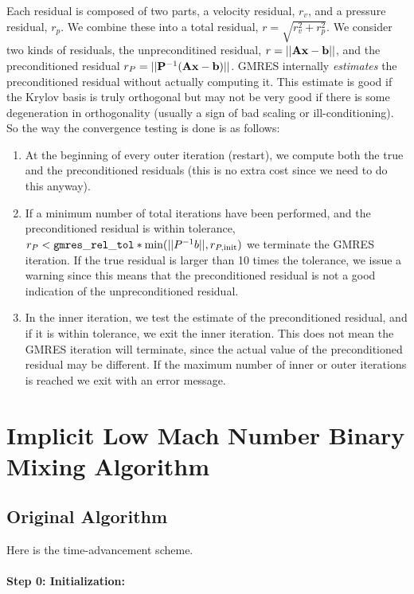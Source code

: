 \documentclass[final]{siamltex}
\def\Ab {{\bf A}}
\def\bb {{\bf b}}
\def\Pb {{\bf P}}
\def\xb {{\bf x}}
\begin{document}
Each residual is composed of two parts, a velocity residual, $r_v$,
and a pressure residual, $r_p$.  We combine these into a total residual, 
$r=\sqrt{r_v^2 + r_p^2}$.  We consider two
kinds of residuals, the unpreconditined residual, $r=||\Ab\xb-\bb||$, 
and the preconditioned 
residual $r_P=||\Pb^{-1}(\Ab\xb-\bb)||$.  GMRES internally {\it estimates} the 
preconditioned residual without actually computing it. This estimate 
is good if the Krylov basis is truly orthogonal but may not be very good 
if there is some degeneration in orthogonality (usually a sign of bad 
scaling or ill-conditioning). So the way the convergence testing is done 
is as follows:\\
\begin{enumerate}
\item At the beginning of every outer iteration (restart), we compute 
both the true and the preconditioned residuals (this is no extra cost 
since we need to do this anyway).\\
\item If a minimum number of total iterations have been performed, and the 
preconditioned residual is within tolerance,
$r_P < {\tt gmres\_rel\_tol}*\min(||P^{-1}b||,r_{P,\rm init})$
we terminate the GMRES iteration. If the true residual is larger than 10 
times the tolerance, we issue a warning since this means that the 
preconditioned residual is not a good indication of the 
unpreconditioned residual.\\
\item In the inner iteration, we  test the estimate of the preconditioned
residual, and if it is within tolerance, we exit the inner iteration.
This does not mean the GMRES iteration will terminate, since the actual
value of the preconditioned residual may be different.
If the maximum number of inner or outer iterations is reached we exit 
with an error message.
\end{enumerate}

\section{Implicit Low Mach Number Binary Mixing Algorithm}
\subsection{Original Algorithm}
Here is the time-advancement scheme.\\ \\
{\bf Step 0: Initialization:}\\
\end{document}
